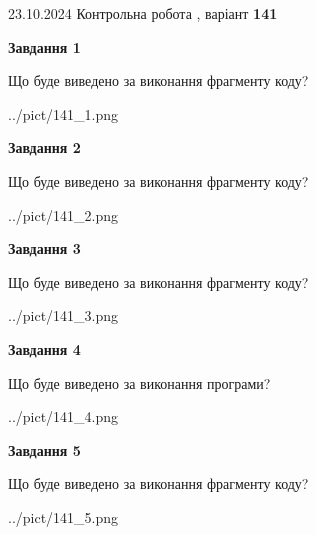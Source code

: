 \documentclass[12pt, ukrainian]{article}
\begin{document}
{\Large{23.10.2024 Контрольна робота , варіант  \No \textbf { 141 }\par}}
{
\begin {large}
{\begin {center}\textbf{Завдання 1}\end {center}}

Що буде виведено за виконання фрагменту коду?\par
\begin{center}
	{../pict/141_1.png}
\end{center}
\newpage

{\begin {center}\textbf{Завдання 2}\end {center}}

Що буде виведено за виконання фрагменту коду?\par
\begin{center}
	{../pict/141_2.png}
\end{center}
\newpage

{\begin {center}\textbf{Завдання 3}\end {center}}

Що буде виведено за виконання фрагменту коду?\par
\begin{center}
	{../pict/141_3.png}
\end{center}
\newpage

{\begin {center}\textbf{Завдання 4}\end {center}}

Що буде виведено за виконання програми?\par
\begin{center}
	{../pict/141_4.png}
\end{center}
\newpage

{\begin {center}\textbf{Завдання 5}\end {center}}

Що буде виведено за виконання фрагменту коду?\par
\begin{center}
	{../pict/141_5.png}
\end{center}
\newpage


\end{large}}
\end{document}
